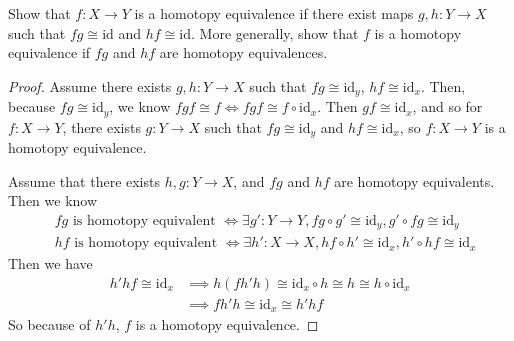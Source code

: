 \documentclass[12pt]{article}
\newenvironment{statement}[2][Statement]{\begin{trivlist}
\item[\hskip \labelsep {\bfseries #1}\hskip \labelsep {\bfseries #2.}]}{\end{trivlist}}
\begin{document}
\begin{statement}[Exercise]{0.11}
    Show that $f: X \to Y$ is a homotopy equivalence if there exist maps $g,h:Y \to X$ such that $fg \cong \text{id}$ and $hf \cong \text{id}$. More generally, show that $f$ is a homotopy equivalence if $fg$ and $hf$ are homotopy equivalences. 
\end{statement}
\begin{proof}
    Assume there exists $g,h: Y \to X$ such that $fg \cong \text{id}_y$, $hf \cong \text{id}_x$. Then, because $fg \cong \text{id}_y$, we know $fgf \cong f \iff fgf \cong f \circ \text{id}_x$. Then $gf \cong \text{id}_x$, and so for $f:X \to Y$, there exists $g: Y \to X$ such that $fg \cong \text{id}_y$ and $hf \cong \text{id}_x$, so $f:X \to Y$ is a homotopy equivalence. 
    \par Assume that there exists $h,g: Y \to X$, and $fg$ and $hf$ are homotopy equivalents. Then we know
    \begin{align*}
        & fg \text{ is homotopy equivalent } \iff \exists g':Y \to Y, fg \circ g' \cong \text{id}_y, g' \circ fg \cong \text{id}_y \\
        & hf \text{ is homotopy equivalent } \iff \exists h':X \to X, hf \circ h' \cong \text{id}_x, h' \circ hf \cong \text{id}_x
    \end{align*}
    Then we have
    \begin{align*}
        h'hf \cong \text{id}_x & \implies h(fh'h) \cong \text{id}_x \circ h \cong h \cong h \circ \text{id}_x \\
        & \implies fh'h \cong \text{id}_x \cong h'hf
    \end{align*}
    So because of $h'h$, $f$ is a homotopy equivalence. 
\end{proof}
\end{document}

